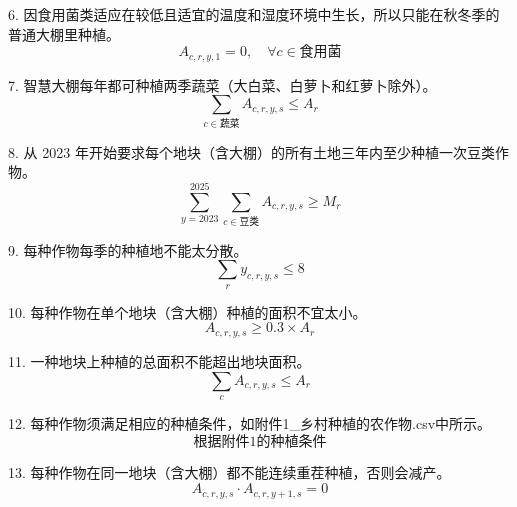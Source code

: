 \documentclass{cumcmthesis}
\begin{document}
6. 因食用菌类适应在较低且适宜的温度和湿度环境中生长，所以只能在秋冬季的普通大棚里种植。
   \begin{equation}
   A_{c,r,y,1} = 0, \quad \forall c \in \text{食用菌}
   \end{equation}

7. 智慧大棚每年都可种植两季蔬菜（大白菜、白萝卜和红萝卜除外）。
   \begin{equation}
   \sum_{c \in \text{蔬菜}} A_{c,r,y,s} \leq A_r
   \end{equation}

8. 从 2023 年开始要求每个地块（含大棚）的所有土地三年内至少种植一次豆类作物。
   \begin{equation}
   \sum_{y=2023}^{2025} \sum_{c \in \text{豆类}} A_{c,r,y,s} \geq M_r
   \end{equation}

9. 每种作物每季的种植地不能太分散。
   \begin{equation}
   \sum_{r} y_{c,r,y,s} \leq 8
   \end{equation}

10. 每种作物在单个地块（含大棚）种植的面积不宜太小。
    \begin{equation}
    A_{c,r,y,s} \geq 0.3 \times A_r
    \end{equation}

11. 一种地块上种植的总面积不能超出地块面积。
    \begin{equation}
    \sum_{c} A_{c,r,y,s} \leq A_r
    \end{equation}

12. 每种作物须满足相应的种植条件，如附件1\_乡村种植的农作物.csv中所示。
    \begin{equation}
    \text{根据附件1的种植条件}
    \end{equation}

13. 每种作物在同一地块（含大棚）都不能连续重茬种植，否则会减产。
    \begin{equation}
    A_{c,r,y,s} \cdot A_{c,r,y+1,s} = 0
    \end{equation}
\end{document}
